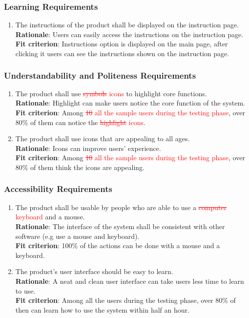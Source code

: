 \documentclass{article}
\begin{document}
\subsubsection{Learning Requirements}
\begin{enumerate}[UH3.1]
    \item The instructions of the product shall be displayed on the instruction page.\\
    \textbf{Rationale}: Users can easily access the instructions on the instruction page.\\
    \textbf{Fit criterion}: Instructions option is displayed on the main page, after clicking it users can see the instructions shown on the instruction page.
\end{enumerate}
\subsubsection{Understandability and Politeness Requirements}
\begin{enumerate}[UH4.1]
    \item The product shall use \textcolor{red}{\st{symbols} icons} to highlight core functions.\\
    \textbf{Rationale}: Highlight can make users notice the core function of the system.\\
    \textbf{Fit criterion}: Among \textcolor{red}{\st{10} all the sample users during the 
    testing phase}, over 80\% of them can notice the \textcolor{red}{\st{highlight} icons}.
    
    \item The product shall use icons that are appealing to all ages.\\
    \textbf{Rationale}: Icons can improve users' experience.\\
    \textbf{Fit criterion}: Among \textcolor{red}{\st{10} all the sample users during the 
    testing phase}, over 80\% of them think the icons are appealing.
\end{enumerate}
\subsubsection{Accessibility Requirements}
\begin{enumerate}[UH5.1]
    \item The product shall be usable by people who are able to use a \textcolor{red}{\st{computer}
     keyboard} and a mouse.\\
    \textbf{Rationale}: The interface of the system shall be consistent with other software (e.g use a
     mouse and keyboard).\\
    \textbf{Fit criterion}: 100\% of the actions can be done with a mouse and a keyboard.
    
    \item The product's user interface should be easy to learn.\\
    \textbf{Rationale}: A neat and clean user interface can take users less time to learn to use.\\
    \textbf{Fit criterion}: Among all the users during the testing phase, over 80\% of then can learn
     how to use the system within half an hour.
\end{enumerate}
\end{document}
